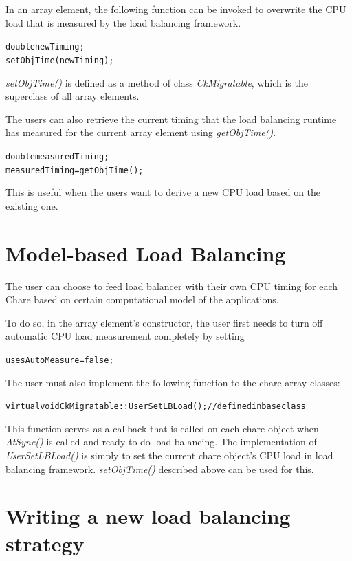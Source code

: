 In an array element, the following function can be invoked to overwrite the 
CPU load that is measured by the load balancing framework.

\begin{alltt}
   double newTiming;
   setObjTime(newTiming);
\end{alltt}

{\em setObjTime()} is defined as a method of class {\em CkMigratable}, which is
the superclass of all array elements.

The users can also retrieve the current timing that the load balancing runtime
has measured for the current array element using {\em getObjTime()}. 
 
\begin{alltt} 
   double measuredTiming; 
   measuredTiming = getObjTime(); 
\end{alltt}

This is useful when the users want to derive a new CPU load based on the 
existing one.

\section{Model-based Load Balancing}

The user can choose to feed load balancer with their own CPU
timing for each Chare based on certain computational model of the applications.

To do so, in the array element's constructor, the user first needs to turn off 
automatic CPU load measurement completely by setting

\begin{alltt}
   usesAutoMeasure = false;
\end{alltt}

The user must also implement the following function to the chare array
classes:

\begin{alltt}
   virtual void CkMigratable::UserSetLBLoad();      // defined in base class
\end{alltt}

This function serves as a callback that is called on each chare object when
{\em AtSync()} is called and ready to do load balancing. The implementation of
{\em UserSetLBLoad()} is simply to set the current chare object's CPU load in
load balancing framework. {\em setObjTime()} described above can be used for
this.

\section{Writing a new load balancing strategy}
\label{lbWriteNewLB}

